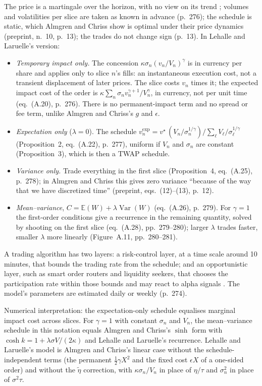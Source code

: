 \begin{qfmodel}
 The price is a martingale over the horizon, with no view on its trend \citep[app.~A, sec.~A.7.2, p.~277]{alpha-laruelle}; volumes and volatilities per slice are taken as known in advance (p.~276); the schedule is static, which Almgren and Chriss show is optimal under their price dynamics (preprint, n.~10, p.~13); the trades do not change sign (p.~13). In Lehalle and Laruelle's version:
\begin{itemize}
\item \emph{Temporary impact only.} The concession $\kappa\sigma_n(v_n/V_n)^\gamma$ is in currency per share and applies only to slice $n$'s fills: an instantaneous execution cost, not a transient displacement of later prices. The slice costs $v_n$ times it; the expected impact cost of the order is $\kappa\sum_n\sigma_nv_n^{\gamma+1}/V_n^{\gamma}$, in currency, not per unit time (eq.~(A.20), p.~276). There is no permanent-impact term and no spread or fee term, unlike Almgren and Chriss's $g$ and $\epsilon$.
\item \emph{Expectation only} ($\lambda=0$). The schedule $v_n^{\exp}=v^\star\,(V_n/\sigma_n^{1/\gamma})\big/\sum_\ell V_\ell/\sigma_\ell^{1/\gamma}$ (Proposition~2, eq.~(A.22), p.~277), uniform if $V_n$ and $\sigma_n$ are constant (Proposition~3), which is then a TWAP schedule.
\item \emph{Variance only.} Trade everything in the first slice (Proposition~4, eq.~(A.25), p.~278); in Almgren and Chriss this gives zero variance ``because of the way that we have discretized time'' (preprint, eqs.~(12)--(13), p.~12).
\item \emph{Mean--variance}, $C=\mathbb E(W)+\lambda\operatorname{Var}(W)$ (eq.~(A.26), p.~279). For $\gamma=1$ the first-order conditions give a recurrence in the remaining quantity, solved by shooting on the first slice (eq.~(A.28), pp.~279--280); larger $\lambda$ trades faster, smaller $\lambda$ more linearly (Figure~A.11, pp.~280--281).
\end{itemize}

 A trading algorithm has two layers: a risk-control layer, at a time scale around 10 minutes, that bounds the trading rate from the schedule; and an opportunistic layer, such as smart order routers and liquidity seekers, that chooses the participation rate within those bounds and may react to alpha signals \citep[app.~A, sec.~A.7, p.~274]{alpha-laruelle}. The model's parameters are estimated daily or weekly (p.~274).

Numerical interpretation: the expectation-only schedule equalises marginal impact cost across slices. For $\gamma=1$ with constant $\sigma_n$ and $V_n$, the mean--variance schedule in this notation equals Almgren and Chriss's $\sinh$ form with $\cosh k=1+\lambda\sigma V/(2\kappa)$ and Lehalle and Laruelle's recurrence. Lehalle and Laruelle's model is Almgren and Chriss's linear case without the schedule-independent terms (the permanent $\tfrac12\gamma X^2$ and the fixed cost $\epsilon X$ of a one-sided order) and without the $\tilde\eta$ correction, with $\kappa\sigma_n/V_n$ in place of $\eta/\tau$ and $\sigma_n^2$ in place of $\sigma^2\tau$.


\end{qfmodel}
